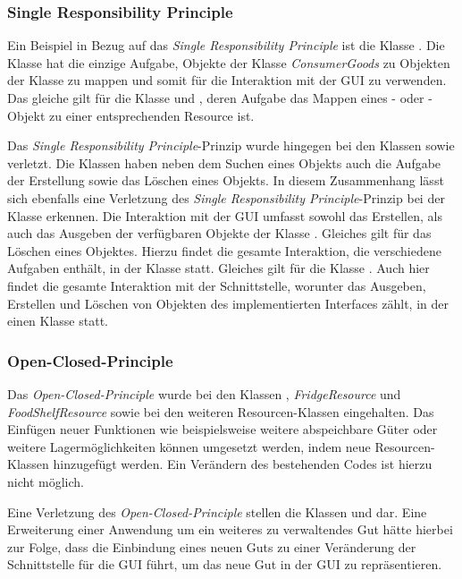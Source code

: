 \subsubsection*{Single Responsibility Principle}
Ein Beispiel in Bezug auf das \textit{Single Responsibility Principle} ist die Klasse .
Die Klasse hat die einzige Aufgabe, Objekte der Klasse \textit{ConsumerGoods} zu Objekten der Klasse  zu mappen und somit für die Interaktion mit der \ac{GUI} zu verwenden.
Das gleiche gilt für die Klasse  und , deren Aufgabe das Mappen eines - oder -Objekt zu einer entsprechenden Resource ist.

Das \textit{Single Responsibility Principle}-Prinzip wurde hingegen bei den Klassen  sowie  verletzt. Die Klassen haben neben dem Suchen eines Objekts auch die Aufgabe der Erstellung sowie das Löschen eines Objekts.
In diesem Zusammenhang lässt sich ebenfalls eine Verletzung des \textit{Single Responsibility Principle}-Prinzip bei der Klasse  erkennen.
Die Interaktion mit der \ac{GUI} umfasst sowohl das Erstellen, als auch das Ausgeben der verfügbaren Objekte der Klasse .
Gleiches gilt für das Löschen eines Objektes.
Hierzu findet die gesamte Interaktion, die verschiedene Aufgaben enthält, in der Klasse  statt.
Gleiches gilt für die Klasse .
Auch hier findet die gesamte Interaktion mit der Schnittstelle, worunter das Ausgeben, Erstellen und Löschen von Objekten des implementierten Interfaces  zählt, in der einen Klasse statt.

\subsubsection*{Open-Closed-Principle}
Das \textit{Open-Closed-Principle} wurde bei den Klassen , \textit{FridgeResource} und \textit{FoodShelfResource} sowie bei den weiteren Resourcen-Klassen eingehalten.
Das Einfügen neuer Funktionen wie beispielsweise weitere abspeichbare Güter oder weitere Lagermöglichkeiten können umgesetzt werden, indem neue Resourcen-Klassen hinzugefügt werden.
Ein Verändern des bestehenden Codes ist hierzu nicht möglich.

Eine Verletzung des \textit{Open-Closed-Principle} stellen die Klassen  und  dar.
Eine Erweiterung einer Anwendung um ein weiteres zu verwaltendes Gut hätte hierbei zur Folge, dass die Einbindung eines neuen Guts zu einer Veränderung der Schnittstelle für die \ac{GUI} führt, um das neue Gut in der \ac{GUI} zu repräsentieren.

